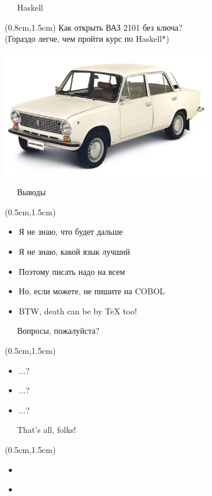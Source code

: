 \documentclass[xetex,18pt,aspectratio=43]{beamer}
\begin{document}
\begin{Large}
\begin{frame}{\ \ \ Haskell}
\begin{textblock*}{\framewidth}(0.8cm,1.5cm)
Как открыть ВАЗ 2101 без ключа?\\
{\small (Гораздо легче, чем пройти курс по Haskell*)}
\begin{minipage}{\textwidth}
  \centering
  \includegraphics[height=5.5cm]{img/lada_2101_1.jpg}
\end{minipage}
\end{textblock*}
\end{frame}

\begin{frame}{\ \ \ Выводы}
\begin{textblock*}{\framewidth-0.8cm}(0.5cm,1.5cm)
\begin{itemize}
  \item Я не знаю, что будет дальше
  \item Я не знаю, какой язык лучший
  \item Поэтому писать надо на всем
  \item Но, если можете, не пишите на COBOL
  \item BTW, death can be by {\TeX} too!
\end{itemize}
\end{textblock*}
\end{frame}

\begin{frame}{\ \ \ Вопросы, пожалуйста?}
\begin{textblock*}{\framewidth-0.8cm}(0.5cm,1.5cm)
\begin{itemize}
  \item ...?
  \item ...?
  \item ...?
\end{itemize}
\end{textblock*}
\end{frame}

\begin{frame}{\ \ \ That's all, folks!}
\begin{textblock*}{\framewidth-0.8cm}(0.5cm,1.5cm)
\begin{itemize}
  \item \href{mailto:alex@gitinsky.com}{\color{blue}{alex@gitinsky.com}}
  \item \href{https://telegram.me/lhommequipleure}{\color{blue}{https://telegram.me/lhommequipleure}}
\end{itemize}
\end{textblock*}
\end{frame}
\end{Large}
\end{document}
